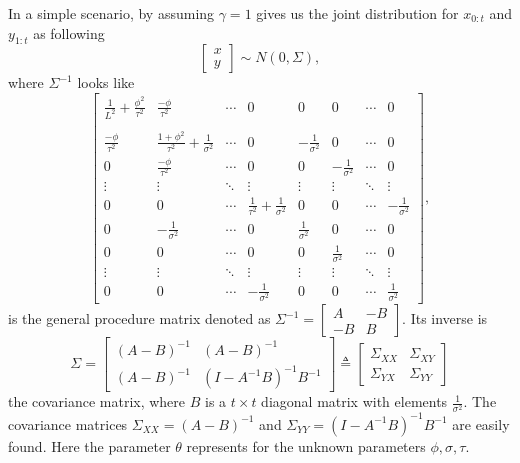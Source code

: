 In a simple scenario, by assuming $\gamma=1$ gives us the joint distribution for $x_{0:t}$ and $y_{1:t}$ as following
\begin{equation*}
\begin{bmatrix} x\\y \end{bmatrix}
\sim N\left(0, \Sigma  \right),
\end{equation*}
where $\Sigma^{-1}$ looks like
\begin{equation*}
\begin{bmatrix}
\frac{1}{L^2}+\frac{\phi^2}{\tau^2} & \frac{-\phi}{\tau^2} & \cdots & 0 & 0 & 0& \cdots & 0\\\\
\frac{-\phi}{\tau^2}   & \frac{1+\phi^2}{\tau^2}+\frac{1}{\sigma^2}& \cdots & 0 & -\frac{1}{\sigma^2} &0 & \cdots & 0 \\
0 & \frac{-\phi}{\tau^2}   &  \cdots & 0 & 0& -\frac{1}{\sigma^2} & \cdots & 0\\
\vdots & \vdots & \ddots & \vdots & \vdots & \vdots & \ddots & \vdots \\
0 & 0   &  \cdots & \frac{1}{\tau^2}+\frac{1}{\sigma^2} & 0 & 0 & \cdots &-\frac{1}{\sigma^2}\\
0 & -\frac{1}{\sigma^2}  & \cdots & 0 & \frac{1}{\sigma^2} & 0 & \cdots & 0 \\
0& 0 & \cdots & 0 & 0 &  \frac{1}{\sigma^2} & \cdots & 0\\
\vdots & \vdots & \ddots & \vdots & \vdots & \vdots & \ddots & \vdots\\
0 & 0& \cdots &-\frac{1}{\sigma^2} & 0 & 0 & \cdots &  \frac{1}{\sigma^2}
\end{bmatrix},
\end{equation*}
is the general procedure matrix denoted as $\Sigma^{-1}=\begin{bmatrix} A & -B \\ -B & B \end{bmatrix}$. Its inverse is 
\begin{equation}
\Sigma=\begin{bmatrix} (A-B)^{-1} &  (A-B)^{-1} \\ (A-B)^{-1} & (I-A^{-1}B)^{-1}B^{-1} \end{bmatrix} \triangleq \begin{bmatrix}
\Sigma_{XX} & \Sigma_{XY}  \\ \Sigma_{YX} & \Sigma_{YY} 
\end{bmatrix}
\end{equation}
the covariance matrix, where $B$ is a $t\times t$ diagonal matrix with elements $\frac{1}{\sigma^2}$. The covariance matrices $\Sigma_{XX} =  (A-B)^{-1}$ and $\Sigma_{YY} =  (I-A^{-1}B)^{-1}B^{-1}$ are easily found. Here the parameter $\theta$ represents for the unknown parameters $\phi,\sigma,\tau$. 

